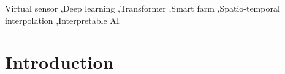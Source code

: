 \documentclass[final,5p,times,twocolumn,authoryear]{elsarticle}
\begin{document}
\begin{frontmatter}
\begin{abstract}
abstract 
for real 

\end{abstract}



\begin{keyword}

Virtual sensor \sep Deep learning \sep Transformer \sep Smart farm \sep  Spatio-temporal interpolation \sep Interpretable AI 




\end{keyword}

\end{frontmatter}







\renewcommand{\figurename}{Fig.} %


\section{Introduction}
\label{sec:intro}
\end{document}
